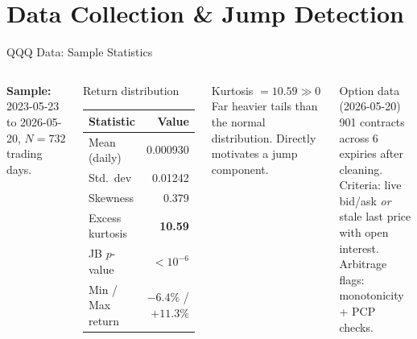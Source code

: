 \documentclass[aspectratio=169,10pt]{beamer}
\begin{document}
\section{Data Collection \& Jump Detection}

\begin{frame}{QQQ Data: Sample Statistics}
\begin{columns}[T]
{\small\textbf{Sample:} 2023-05-23 to 2026-05-20, $N=732$ trading days.}

\smallskip
\begin{block}{Return distribution}
\footnotesize
\begin{tabular}{lr}
\toprule
Statistic & Value \\
\midrule
Mean (daily)      & 0.000930 \\
Std.\ dev         & 0.01242 \\
Skewness          & 0.379 \\
Excess kurtosis   & \textbf{10.59} \\
JB $p$-value      & $<10^{-6}$ \\
Min / Max return  & $-6.4\%$ / $+11.3\%$ \\
\bottomrule
\end{tabular}
\end{block}

\begin{alertblock}{Kurtosis $= 10.59 \gg 0$}
\footnotesize Far heavier tails than the normal distribution. Directly motivates a jump component.
\end{alertblock}

\medskip
\begin{block}{Option data (2026-05-20)}
\footnotesize 901 contracts across 6 expiries after cleaning.\\
Criteria: live bid/ask \emph{or} stale last price with open interest.\\
Arbitrage flags: monotonicity + PCP checks.
\end{block}
\end{columns}
\end{frame}
\end{document}
